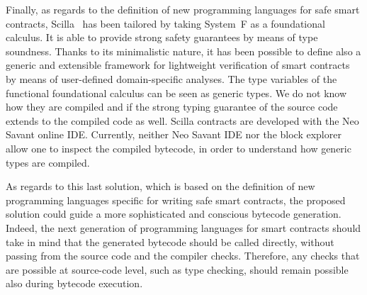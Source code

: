 Finally, as regards to the definition of new programming languages for safe smart contracts,
Scilla~\cite{scilla} has been tailored by taking System~F as a foundational calculus.
It is able to provide strong safety guarantees by means of type soundness.
Thanks to its minimalistic nature, it has been possible to define also a generic and extensible
framework for lightweight verification of smart contracts by means of user-defined domain-specific
analyses. The type variables of the functional foundational calculus can be seen as
generic types. We do not know how they are compiled and if the strong typing guarantee of the
source code extends to the compiled code as well. Scilla contracts are developed with
the Neo Savant online IDE. Currently, neither Neo Savant IDE nor the block explorer
allow one to inspect the compiled bytecode, in order to understand how generic types are compiled.

As regards to this last solution, which is based on the
definition of new programming languages specific for writing
safe smart contracts, the proposed solution could guide
a more sophisticated and conscious bytecode generation.
Indeed, the next generation of programming languages for smart contracts
should take in mind that the generated bytecode should be called directly,
without passing from the source code and the compiler checks.
Therefore, any checks that are possible at source-code level,
such as type checking, should remain possible also during bytecode execution.
